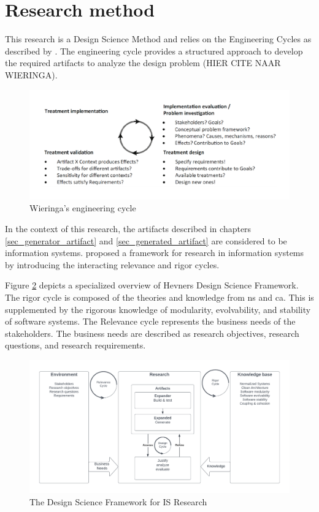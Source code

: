 \section{Research method} \label{sec_research_method}

This research is a Design Science Method and relies on the Engineering Cycles as described
by \textcite{wieringa_design_2014}. The engineering cycle provides a structured approach
to develop the required artifacts to analyze the design problem (HIER CITE NAAR WIERINGA).

\begin{figure}[H]
    \centering
    \includegraphics[width=1\textwidth]{Figures/engineering_cycle.pdf}
    \caption[Engineering cycle]{Wieringa's engineering cycle}
    \label{fig_engineering_cycle}
\end{figure}

In the context of this research, the artifacts described in chapters
\ref{sec_generator_artifact} and \ref{sec_generated_artifact} are considered to be
information systems. \citeauthor{hevner_design_nodate} proposed a framework for research
in information systems by introducing the interacting relevance and rigor cycles.

Figure \ref{fig_dsr} depicts a specialized overview of Hevners Design Science Framework.
The rigor cycle is composed of the theories and knowledge from \gls{ns}
and \gls{ca}. This is supplemented by the rigorous knowledge of modularity,
evolvability, and stability of software systems. The Relevance cycle represents the
business needs of the stakeholders. The business needs are described as research
objectives, research questions, and research requirements.

\begin{figure}[H]
    \centering
    \includegraphics[width=1\textwidth]{Figures/rigor_relevance_cycle.pdf}
    \caption[DSF]{The Design Science Framework for IS Research}
    \label{fig_dsr}
\end{figure}